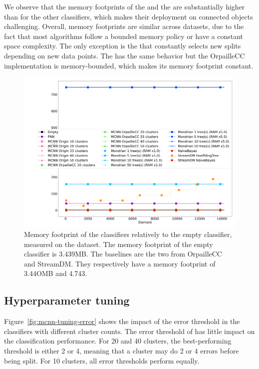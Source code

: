 We observe that the memory footprints of the \mondrianforest and the
\hoeffdingtree are substantially higher than for the other classifiers, which makes 
their deployment on connected objects challenging.
Overall, memory footprints are similar across datasets, due to the
fact that most algorithms follow a bounded memory policy or have a constant
space complexity.  The only exception is the \hoeffdingtree that constantly
selects new splits depending on new data points. The \mondrianforest has the
same behavior but the OrpailleCC implementation is memory-bounded, which
makes its memory footprint constant.

\begin{figure}
	\includegraphics[width=\linewidth]{figures/results/banos_6_memory.png}
	\caption{Memory footprint of the classifiers relatively to the empty
	classifier, measured on the \banosdataset dataset. The memory footprint of the empty
	classifier is 3.439MB. The baselines are the two \naivebayes from OrpailleCC
		and StreamDM. They respectively have a memory footprint of 3.44OMB and
		4.743.}
	\label{fig:memory}
\end{figure}


\subsection{Hyperparameter tuning}

Figure~\ref{fig:mcnn-tuning-error} shows the impact of the error threshold
in the \mcnn classifiers with different cluster counts. The error
threshold of \mcnn has little impact on the classification performance. For
20 and 40 clusters, the best-performing threshold is either 2 or 4, meaning
that a cluster may do 2 or 4 errors before being split. For 10 clusters,
all error thresholds perform equally.

